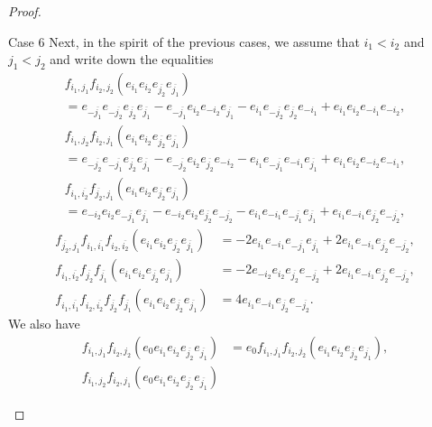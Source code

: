 \documentclass[ALCO,ThmDefs,Unicode]{cedram}
\begin{document}
\begin{proof}
\begin{enonce*}[remark]{Case 6}
Next, in the spirit of the previous cases, we assume that $i_1<i_2$ and $j_1<j_2$ and write down the equalities
\begin{multline*}
f_{i_1,j_1}f_{i_2,j_2}(e_{i_1}e_{i_2}e_{\overline{j_2}}e_{\overline{j_1}})
\\
=e_{-\overline{j_1}}e_{-\overline{j_2}}e_{\overline{j_2}}e_{\overline{j_1}}-e_{-\overline{j_1}}e_{i_2}e_{-i_2}e_{\overline{j_1}}-e_{i_1}e_{-\overline{j_2}}e_{\overline{j_2}}e_{-i_1}+e_{i_1}e_{i_2}e_{-i_1}e_{-i_2},
\end{multline*}
\begin{multline*}
f_{i_1,j_2}f_{i_2,j_1}(e_{i_1}e_{i_2}e_{\overline{j_2}}e_{\overline{j_1}})
\\
=e_{-\overline{j_2}}e_{-\overline{j_1}}e_{\overline{j_2}}e_{\overline{j_1}}-e_{-\overline{j_2}}e_{i_2}e_{\overline{j_2}}e_{-i_2}-e_{i_1}e_{-\overline{j_1}}e_{-i_1}e_{\overline{j_1}}+e_{i_1}e_{i_2}e_{-i_2}e_{-i_1},
\end{multline*}
\begin{multline*}
f_{i_1,\overline{i_2}}f_{\overline{j_2},j_1}(e_{i_1}e_{i_2}e_{\overline{j_2}}e_{\overline{j_1}})\\
=e_{-i_2}e_{i_2}e_{-\overline{j_1}}e_{\overline{j_1}}-e_{-i_2}e_{i_2}e_{\overline{j_2}}e_{-\overline{j_2}}-e_{i_1}e_{-i_1}e_{-\overline{j_1}}e_{\overline{j_1}}+e_{i_1}e_{-i_1}e_{\overline{j_2}}e_{-\overline{j_2}},
\end{multline*}
\begin{align*}
f_{\overline{j_2},j_1}f_{i_1,\overline{i_1}}f_{i_2,\overline{i_2}}(e_{i_1}e_{i_2}e_{\overline{j_2}}e_{\overline{j_1}})
&=-2e_{i_1}e_{-i_1}e_{-\overline{j_1}}e_{\overline{j_1}}+2e_{i_1}e_{-i_1}e_{\overline{j_2}}e_{-\overline{j_2}},
\\
f_{i_1,\overline{i_2}}f_{\overline{j_2}}f_{\overline{j_1}}(e_{i_1}e_{i_2}e_{\overline{j_2}}e_{\overline{j_1}})
&=-2e_{-i_2}e_{i_2}e_{\overline{j_2}}e_{-\overline{j_2}}+2e_{i_1}e_{-i_1}e_{\overline{j_2}}e_{-\overline{j_2}},
\\
f_{i_1,\overline{i_1}}f_{i_2,\overline{i_2}}f_{\overline{j_2}}f_{\overline{j_1}}(e_{i_1}e_{i_2}e_{\overline{j_2}}e_{\overline{j_1}})
&=4e_{i_1}e_{-i_1}e_{\overline{j_2}}e_{-\overline{j_2}}.
\end{align*}
We also have
\begin{align*}
f_{i_1,j_1}f_{i_2,j_2}(e_0e_{i_1}e_{i_2}e_{\overline{j_2}}e_{\overline{j_1}})
&=e_0f_{i_1,j_1}f_{i_2,j_2}(e_{i_1}e_{i_2}e_{\overline{j_2}}e_{\overline{j_1}}),
\\
f_{i_1,j_2}f_{i_2,j_1}(e_0e_{i_1}e_{i_2}e_{\overline{j_2}}e_{\overline{j_1}})

\end{align*}
\end{enonce*}
\end{proof}
\end{document}
